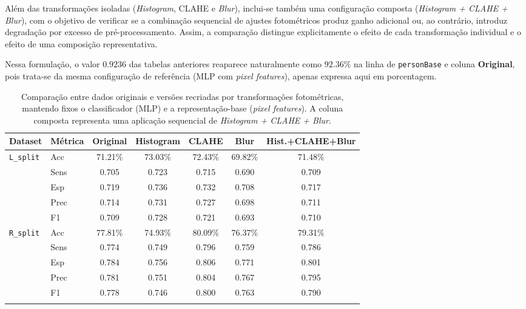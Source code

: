 \documentclass[12pt,a4paper]{article}
\begin{document}
Além das transformações isoladas (\textit{Histogram}, CLAHE e \textit{Blur}), inclui-se também uma configuração composta (\textit{Histogram + CLAHE + Blur}), com o objetivo de verificar se a combinação sequencial de ajustes fotométricos produz ganho adicional ou, ao contrário, introduz degradação por excesso de pré-processamento. Assim, a comparação distingue explicitamente o efeito de cada transformação individual e o efeito de uma composição representativa.

Nessa formulação, o valor \(0.9236\) das tabelas anteriores reaparece naturalmente como \(92.36\%\) na linha de \texttt{personBase} e coluna \textbf{Original}, pois trata-se da mesma configuração de referência (MLP com \textit{pixel features}), apenas expressa aqui em porcentagem.

\begin{table}[htbp]
\centering
\caption{Comparação entre dados originais e versões recriadas por transformações fotométricas, mantendo fixos o classificador (MLP) e a representação-base (\emph{pixel features}). A coluna composta representa uma aplicação sequencial de \emph{Histogram + CLAHE + Blur}.}
\label{tab:original-vs-recriado}
\scriptsize
\setlength{\tabcolsep}{3pt}
\renewcommand{\arraystretch}{1.10}
\begin{tabular}{llccccc}
\toprule
\textbf{Dataset} & \textbf{Métrica} & \textbf{Original} & \textbf{Histogram} & \textbf{CLAHE} & \textbf{Blur} & \textbf{Hist.+CLAHE+Blur} \\
\midrule
\texttt{L\_split} & Acc  & 71.21\% & 73.03\% & 72.43\% & 69.82\% & 71.48\% \\
                  & Sens & 0.705   & 0.723   & 0.715   & 0.690   & 0.709 \\
                  & Esp  & 0.719   & 0.736   & 0.732   & 0.708   & 0.717 \\
                  & Prec & 0.714   & 0.731   & 0.727   & 0.698   & 0.711 \\
                  & F1   & 0.709   & 0.728   & 0.721   & 0.693   & 0.710 \\
\addlinespace[2pt]

\texttt{R\_split} & Acc  & 77.81\% & 74.93\% & 80.09\% & 76.37\% & 79.31\% \\
                  & Sens & 0.774   & 0.749   & 0.796   & 0.759   & 0.786 \\
                  & Esp  & 0.784   & 0.756   & 0.806   & 0.771   & 0.801 \\
                  & Prec & 0.781   & 0.751   & 0.804   & 0.767   & 0.795 \\
                  & F1   & 0.778   & 0.746   & 0.800   & 0.763   & 0.790 \\
\addlinespace[2pt]


\end{tabular}
\end{table}
\end{document}
